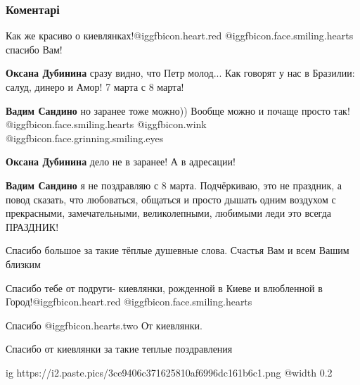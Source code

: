  
 
 
 
 
\subsubsection{Коментарі}

\begin{itemize} %
Как же красиво о киевлянках!@igg{fbicon.heart.red}  @igg{fbicon.face.smiling.hearts} 
спасибо Вам!

\begin{itemize} %
\textbf{Оксана Дубинина} сразу видно, что Петр молод... Как говорят у нас в Бразилии: салуд, динеро и Амор! 7 марта с 8 марта!

\textbf{Вадим Сандино} но заранее тоже можно))
Вообще можно и почаще просто так! @igg{fbicon.face.smiling.hearts}  @igg{fbicon.wink}  @igg{fbicon.face.grinning.smiling.eyes} 

\textbf{Оксана Дубинина} дело не в заранее! А в адресации!

\textbf{Вадим Сандино} я не поздравляю с 8 марта. Подчёркиваю, это не праздник, а повод сказать, что любоваться, общаться и просто дышать одним воздухом с прекрасными, замечательными, великолепными, любимыми леди это всегда ПРАЗДНИК!
\end{itemize} %

Спасибо большое за такие тёплые душевные слова. Счастья Вам и всем Вашим близким


Спасибо тебе от подруги- киевлянки, рожденной в Киеве и влюбленной в Город!@igg{fbicon.heart.red} @igg{fbicon.face.smiling.hearts} 


Спасибо @igg{fbicon.hearts.two} 
От киевлянки.

Спасибо от
киевлянки за такие теплые поздравления


\ifcmt
  ig https://i2.paste.pics/3ce9406c371625810af6996dc161b6c1.png
  @width 0.2
\fi


\end{itemize}
